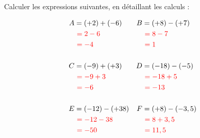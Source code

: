 \documentclass[Controlev1-correction]{subfiles}
\begin{document}
\maketitle

\begin{exercice}[(3 points)] Calculer les expressions suivantes, en détaillant les calculs :

	\begin{align*}
		A & = (+2) + (-6)             & B & = (+8) - (+7)            \\
		  & \ \correction{= 2 - 6}    &   & \  \correction{= 8 - 7}  \\
		  & \  \correction{= -4}      &   & \  \correction{= 1}      \\
		\\
		C & = (-9) + (+3)             & D & =  (-18) - (-5)          \\
		  & \ \correction{= -9 + 3}   &   & \ \correction{= -18 + 5} \\
		  & \ \correction{= -6}       &   & \ \correction{= -13}     \\
		\\
		E & = (-12) - (+38)           & F & =   (+8) - (-3,5)        \\
		  & \ \correction{= -12 - 38} &   & \ \correction{= 8 + 3,5} \\
		  & \ \correction{= -50}      &   & \ \correction{= 11,5}    \\
	\end{align*}
\end{exercice}
\end{document}
